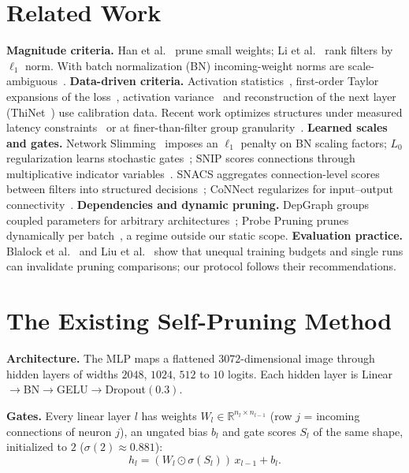 \documentclass[conference]{IEEEtran}
\begin{document}
\section{Related Work}
\textbf{Magnitude criteria.} Han et al.~\cite{han2015learning} prune small weights;
Li et al.~\cite{li2017filters} rank filters by $\ell_1$ norm. With batch normalization
(BN) incoming-weight norms are scale-ambiguous~\cite{ye2018rethinking,ioffe2015bn}.
\textbf{Data-driven criteria.} Activation statistics~\cite{hu2016trimming}, first-order
Taylor expansions of the loss~\cite{molchanov2017pruning,molchanov2019importance},
activation variance~\cite{berisha2025variance} and reconstruction of the next layer
(ThiNet~\cite{luo2017thinet}) use calibration data. Recent work optimizes structures under
measured latency constraints~\cite{sun2025mdp} or at finer-than-filter group
granularity~\cite{zhang2025flexible}.
\textbf{Learned scales and gates.} Network Slimming~\cite{liu2017slimming} imposes an
$\ell_1$ penalty on BN scaling factors; $L_0$ regularization learns stochastic
gates~\cite{louizos2018l0}; SNIP scores connections through multiplicative indicator
variables~\cite{lee2019snip}. SNACS aggregates connection-level scores between filters
into structured decisions~\cite{ganesh2024snacs}; CoNNect regularizes for input--output
connectivity~\cite{franssen2025connect}. \textbf{Dependencies and dynamic pruning.}
DepGraph groups coupled parameters for arbitrary architectures~\cite{fang2023depgraph};
Probe Pruning prunes dynamically per batch~\cite{le2025probe}, a regime outside our
static scope. \textbf{Evaluation practice.} Blalock et al.~\cite{blalock2020state} and
Liu et al.~\cite{liu2019rethinking} show that unequal training budgets and single runs
can invalidate pruning comparisons; our protocol follows their recommendations.

\section{The Existing Self-Pruning Method}\label{sec:existing}
\textbf{Architecture.} The MLP maps a flattened $3072$-dimensional image through hidden
layers of widths $2048$, $1024$, $512$ to $10$ logits. Each hidden layer is
Linear$\to$BN$\to$GELU$\to$Dropout$(0.3)$.

\textbf{Gates.} Every linear layer $l$ has weights $W_l\in\mathbb{R}^{n_l\times n_{l-1}}$
(row $j$ = incoming connections of neuron $j$), an ungated bias $b_l$ and gate scores
$S_l$ of the same shape, initialized to $2$ ($\sigma(2)\approx0.881$):
\begin{equation}
h_l = (W_l \odot \sigma(S_l))\,x_{l-1} + b_l .
\end{equation}
\end{document}
